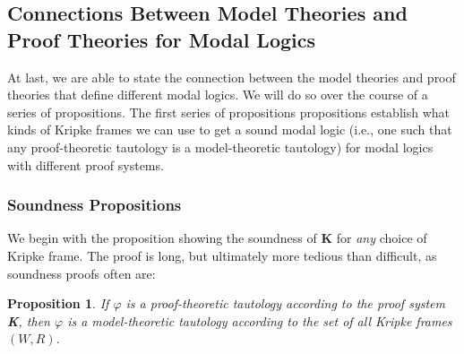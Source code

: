 \documentclass[11pt]{article}
\newtheorem{proposition}[theorem]{Proposition}
\theoremstyle{definition}
\theoremstyle{remark}
\begin{document}
\subsection{Connections Between Model Theories and Proof Theories for Modal Logics}
At last, we are able to state the connection between the model theories and proof theories that define different modal logics. We will do so over the course of a series of propositions. The first series of propositions propositions establish what kinds of Kripke frames we can use to get a sound modal logic (i.e., one such that any proof-theoretic tautology is a model-theoretic tautology) for modal logics with different proof systems. 

\subsubsection{Soundness Propositions}
We begin with the proposition showing the soundness of \textbf{K} for \textit{any} choice of Kripke frame. The proof is long, but ultimately more tedious than difficult, as soundness proofs often are:\par 
\begin{proposition}
    If $\varphi$ is a proof-theoretic tautology according to the proof system \textbf{K}, then $\varphi$ is a model-theoretic tautology according to the set of all Kripke frames $(W,R)$.
\end{proposition}
\end{document}
